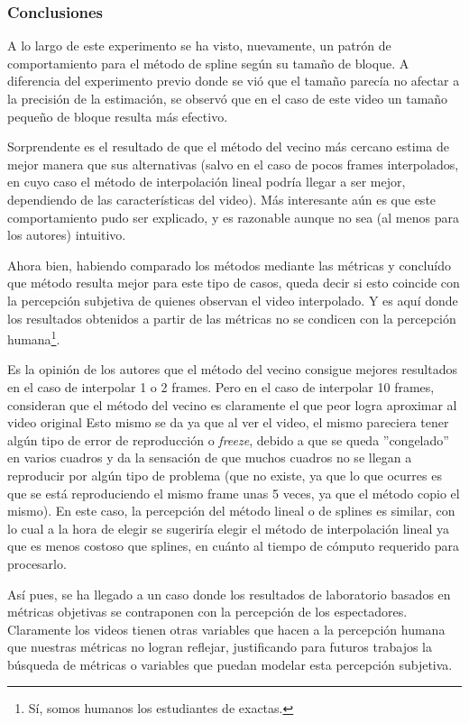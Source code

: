 \subsubsection{Conclusiones}
\par A lo largo de este experimento se ha visto, nuevamente, un patr\'on de
comportamiento para el m\'etodo de spline seg\'un su tama\~no de bloque. A
diferencia del experimento previo donde se vi\'o que el tama\~no parec\'ia no
afectar a la precisi\'on de la estimaci\'on, se observ\'o que en el caso de
este video un tama\~no peque\~no de bloque resulta m\'as efectivo.

\par Sorprendente es el resultado de que el m\'etodo del vecino m\'as cercano
estima de mejor manera que sus alternativas (salvo en el caso de pocos frames
interpolados, en cuyo caso el m\'etodo de interpolaci\'on lineal podr\'ia llegar
a ser mejor, dependiendo de las caracter\'isticas del video). M\'as interesante
a\'un es que este comportamiento pudo ser explicado, y es razonable aunque no
sea (al menos para los autores) intuitivo.

\par Ahora bien, habiendo comparado los m\'etodos mediante las m\'etricas y
conclu\'ido que m\'etodo resulta mejor para este tipo de casos, queda decir
si esto coincide con la percepci\'on subjetiva de quienes observan el video
interpolado. Y es aqu\'i donde los resultados obtenidos a partir de las m\'etricas
no se condicen con la percepci\'on humana\footnote{S\'i, somos humanos los
estudiantes de exactas.}.

\par Es la opini\'on de los autores que el m\'etodo del vecino consigue mejores
resultados en el caso de interpolar 1 o 2 frames. Pero en el caso de interpolar
10 frames, consideran que el m\'etodo del vecino es claramente el que peor
logra aproximar al video original Esto mismo se da ya que al ver el video, el
mismo pareciera tener alg\'un tipo de error de reproducci\'on o \emph{freeze},
debido a que se queda ''congelado'' en varios cuadros y da la sensaci\'on de
que muchos cuadros no se llegan a reproducir por alg\'un tipo de problema (que
no existe, ya que lo que ocurres es que se est\'a reproduciendo el mismo frame
unas 5 veces, ya que el m\'etodo copio el mismo). En este caso, la percepci\'on
del m\'etodo lineal o de splines es similar, con lo cual a la hora de elegir se
sugerir\'ia elegir el m\'etodo de interpolaci\'on lineal ya que es menos
costoso que splines, en cu\'anto al tiempo de c\'omputo requerido para
procesarlo.

\par As\'i pues, se ha llegado a un caso donde los resultados de laboratorio
basados en m\'etricas objetivas se contraponen con la percepci\'on de los
espectadores. Claramente los videos tienen otras variables que hacen a la
percepci\'on humana que nuestras m\'etricas no logran reflejar, justificando
para futuros trabajos la b\'usqueda de m\'etricas o variables que puedan modelar
esta percepci\'on subjetiva.


